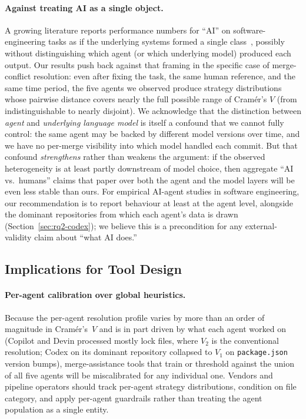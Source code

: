 \documentclass[sigconf,anonymous]{acmart}
\begin{document}
\paragraph{Against treating AI as a single object.} A growing literature reports performance numbers for ``AI'' on software-engineering tasks as if the underlying systems formed a single class~\cite{liaidev2025se3,peng2023copilot,jimenez2024swebench,wang2024llmagents}, possibly without distinguishing which agent (or which underlying model) produced each output. Our results push back against that framing in the specific case of merge-conflict resolution: even after fixing the task, the same human reference, and the same time period, the five agents we observed produce strategy distributions whose pairwise distance covers nearly the full possible range of Cram\'{e}r's $V$ (from indistinguishable to nearly disjoint). We acknowledge that the distinction between \emph{agent} and \emph{underlying language model} is itself a confound that we cannot fully control: the same agent may be backed by different model versions over time, and we have no per-merge visibility into which model handled each commit. But that confound \emph{strengthens} rather than weakens the argument: if the observed heterogeneity is at least partly downstream of model choice, then aggregate ``AI vs.\ humans'' claims that paper over both the agent and the model layers will be even less stable than ours. For empirical AI-agent studies in software engineering, our recommendation is to report behaviour at least at the agent level, alongside the dominant repositories from which each agent's data is drawn (Section~\ref{sec:rq2-codex}); we believe this is a precondition for any external-validity claim about ``what AI does.''

\subsection{Implications for Tool Design}
\label{sec:disc-tools}

\paragraph{Per-agent calibration over global heuristics.} Because the per-agent resolution profile varies by more than an order of magnitude in Cram\'{e}r's~$V$ and is in part driven by what each agent worked on (Copilot and Devin processed mostly lock files, where $V_2$ is the conventional resolution; Codex on its dominant repository collapsed to $V_1$ on \texttt{package.json} version bumps), merge-assistance tools that train or threshold against the union of all five agents will be miscalibrated for any individual one. Vendors and pipeline operators should track per-agent strategy distributions, condition on file category, and apply per-agent guardrails rather than treating the agent population as a single entity.
\end{document}
